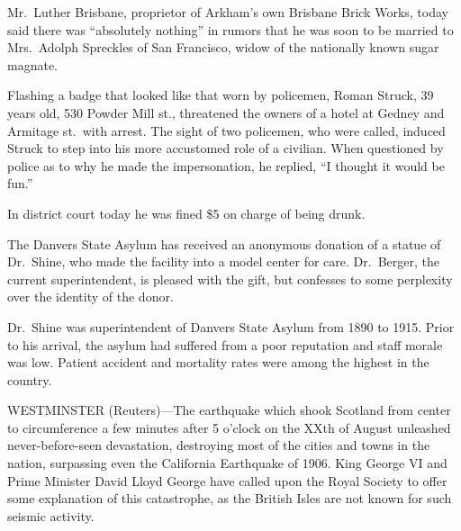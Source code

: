 \documentclass{newspaper1920}
\def\minipageheight{37\baselineskip}
\begin{document}
\begin{multicols}{3}
Mr.~Luther Brisbane, proprietor of Arkham's own Brisbane Brick Works,
today said there was ``absolutely nothing'' in rumors that he was soon
to be married to Mrs.~Adolph Spreckles of San Francisco, widow of the
nationally known sugar magnate.

\halfrule


Flashing a badge that looked like that worn by policemen, Roman
Struck, 39 years old, 530 Powder Mill st., threatened the owners of a
hotel at Gedney and Armitage st.\ with arrest.  The sight of two
policemen, who were called, induced Struck to step into his more
accustomed role of a civilian.  When questioned by police as to why he
made the impersonation, he replied, ``I thought it would be fun.''

In district court today he was fined \$5 on charge of being drunk.

\halfrule


The Danvers State Asylum has received an anonymous donation of a
statue of Dr.~Shine, who made the facility into a model center for
care.  Dr.~Berger, the current superintendent, is pleased with the
gift, but confesses to some perplexity over the identity of the donor.

Dr.~Shine was superintendent of Danvers State Asylum from 1890 to
1915.  Prior to his arrival, the asylum had suffered from a poor
reputation and staff morale was low.  Patient accident and mortality
rates were among the highest in the country.

\columnbreak

\noindent
\begin{minipage}[t][\minipageheight]{2\columnwidth+1\columnsep}
\fancyrule
\vspace{-\baselineskip}

\begin{multicols}{2}
WESTMINSTER (Reuters)---The earthquake which shook Scotland from
center to circumference a few minutes after 5 o'clock on the XXth of
August unleashed never-before-seen devastation, destroying most of the
cities and towns in the nation, surpassing even the California
Earthquake of 1906.  King George VI and Prime Minister David Lloyd
George have called upon the Royal Society to offer some explanation of
this catastrophe, as the British Isles are not known for such seismic
activity.


\end{multicols}
\end{minipage}
\end{multicols}
\end{document}
